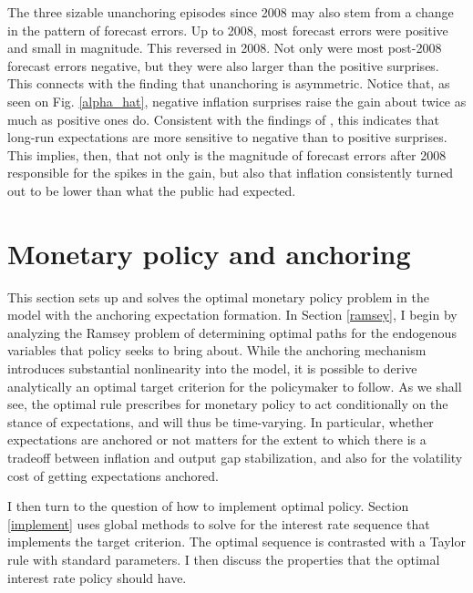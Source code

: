 \documentclass[11pt]{article}
\renewcommand{\[}{\begin{equation}}
\renewcommand{\]}{\end{equation}}
\begin{document}
The three sizable unanchoring episodes since 2008 may also stem from a change in the pattern of forecast errors. Up to 2008, most forecast errors were positive and small in magnitude. This reversed in 2008. Not only were most post-2008 forecast errors negative, but they were also larger than the positive surprises. This connects with the finding that unanchoring is asymmetric. Notice that, as seen on Fig. \ref{alpha_hat}, negative inflation surprises raise the gain about twice as much as positive ones do. Consistent with the findings of \cite{hebden2020robust}, this indicates that long-run expectations are more sensitive to negative than to positive surprises. This implies, then, that not only is the magnitude of forecast errors after 2008 responsible for the spikes in the gain, but also that inflation consistently turned out to be lower than what the public had expected. 


\section{Monetary policy and anchoring}\label{analytical}

This section sets up and solves the optimal monetary policy problem in the model with the anchoring expectation formation. In Section \ref{ramsey}, I begin by analyzing the Ramsey problem of determining optimal paths for the endogenous variables that policy seeks to bring about.  While the anchoring mechanism introduces substantial nonlinearity into the model, it is possible to derive analytically an optimal target criterion for the policymaker to follow. As we shall see, the optimal rule prescribes for monetary policy to act conditionally on the stance of expectations, and will thus be time-varying. In particular, whether expectations are anchored or not matters for the extent to which there is a tradeoff between inflation and output gap stabilization, and also for the volatility cost of getting expectations anchored.  

I then turn to the question of how to implement optimal policy. Section \ref{implement} uses global methods to solve for the interest rate sequence that implements the target criterion. The optimal sequence is contrasted with a Taylor rule with standard parameters. I then discuss the properties that the optimal interest rate policy should have. 
\end{document}
